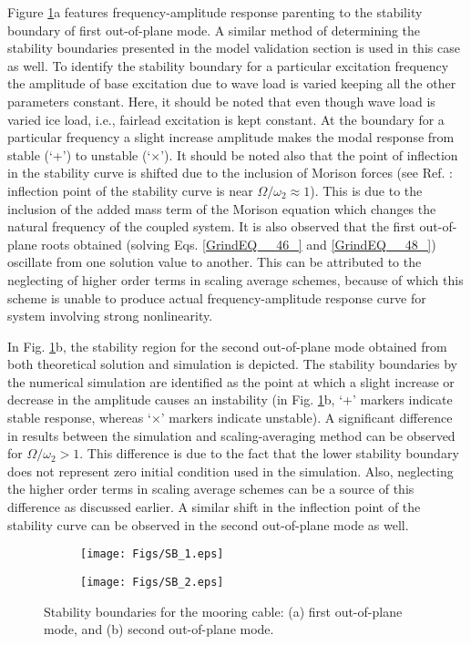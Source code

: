 \documentclass[review]{elsarticle}
\begin{document}
Figure \ref{SB_y}a features frequency-amplitude response parenting to the stability boundary of first out-of-plane mode. A similar method of determining the stability boundaries presented in the model validation section is used in this case as well. To identify the stability boundary for a particular excitation frequency the amplitude of base excitation due to wave load is varied keeping all the other parameters constant. Here, it should be noted that even though wave load is varied ice load, i.e., fairlead excitation is kept constant. At the boundary for a particular frequency a slight increase amplitude makes the modal response from stable (`+') to unstable (`$\times$').  It should be noted also that the point of inflection in the stability curve is shifted  due  to  the  inclusion  of  Morison  forces  (see Ref. \cite{Gonzalez_2008}: inflection point of the stability curve is near ${\Omega}/\omega_2 \approx 1$). This is due to the inclusion of the added mass term of the Morison equation which changes the natural frequency of the coupled system. It is also observed that the first out-of-plane roots obtained (solving Eqs. \eqref{GrindEQ__46_} and \eqref{GrindEQ__48_}) oscillate from one solution value to another. This can be attributed to the neglecting of higher order terms in scaling average schemes, because of which this scheme is unable to produce actual frequency-amplitude response curve for system involving strong nonlinearity. 

In Fig. \ref{SB_y}b, the stability region for the second out-of-plane mode obtained from both theoretical solution and simulation is depicted. The stability boundaries by the numerical simulation are identified as the point at which a slight increase or decrease in the amplitude causes an instability (in Fig. \ref{SB_y}b, `+' markers indicate stable response, whereas `$\times$' markers indicate unstable). A significant difference in results between the simulation and scaling-averaging method can be observed for ${\Omega}/\omega_2 > 1$. This difference is due to the fact that the lower stability boundary does not represent zero initial condition used in the simulation. Also, neglecting the higher order terms in scaling average schemes can be a source of this difference as discussed earlier. A similar shift in the inflection point of the stability curve can be observed in the second out-of-plane mode as well.

%
%
\begin{figure}
	\centering
	\begin{subfigure}{.5\textwidth}
		\centering
		\texttt{[image: Figs/SB\_1.eps]}
		\caption{}
	\end{subfigure}%
	\begin{subfigure}{.5\textwidth}
		\centering
		\texttt{[image: Figs/SB\_2.eps]}
		\caption{}
	\end{subfigure}
	\caption{Stability boundaries for the mooring cable: (a)  first out-of-plane mode,  and (b) second out-of-plane mode.}
	\label{SB_y}
\end{figure}
\end{document}
